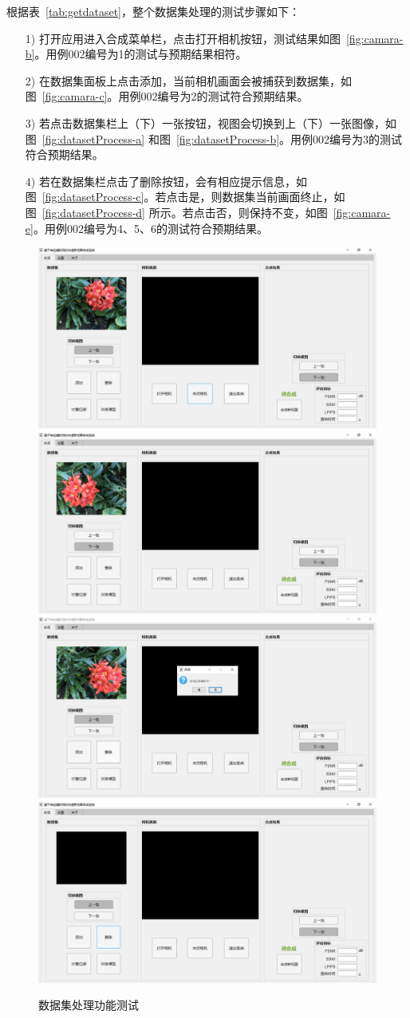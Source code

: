 根据表~\ref{tab:getdataset}，整个数据集处理的测试步骤如下：
\begin{enumerate}
	\item[1)] 打开应用进入合成菜单栏，点击打开相机按钮，测试结果如图~\ref{fig:camara-b}。用例002编号为1的测试与预期结果相符。
	\item[2)] 在数据集面板上点击添加，当前相机画面会被捕获到数据集，如图~\ref{fig:camara-c}。用例002编号为2的测试符合预期结果。
	\item[3)] 若点击数据集栏上（下）一张按钮，视图会切换到上（下）一张图像，如图~\ref{fig:datasetProcess-a} 和图~\ref{fig:datasetProcess-b}。用例002编号为3的测试符合预期结果。
	\item[4)] 若在数据集栏点击了删除按钮，会有相应提示信息，如图~\ref{fig:datasetProcess-c}。若点击是，则数据集当前画面终止，如图~\ref{fig:datasetProcess-d} 所示。若点击否，则保持不变，如图~\ref{fig:camara-e}。用例002编号为4、5、6的测试符合预期结果。
\end{enumerate}
\pagebreak
\begin{figure}[thbp]
	\centering 
	{\includegraphics[width=0.45\linewidth]{figures/system/2-a.png}}
	{\includegraphics[width=0.45\linewidth]{figures/system/2-b.png}}
	{\includegraphics[width=0.45\linewidth]{figures/system/2-c.png}}
	{\includegraphics[width=0.45\linewidth]{figures/system/2-d.png}}
	\caption{数据集处理功能测试}
	\label{fig:datasetProcess}
\end{figure}

